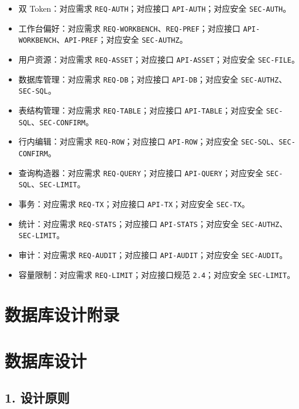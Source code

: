 \documentclass[
  a4paper,
  UTF8]{ctexart}
\providecommand{\tightlist}{%
  \setlength{\itemsep}{0pt}\setlength{\parskip}{0pt}}
\begin{document}
\begin{itemize}
\tightlist
\item
  双 Token：对应需求 \texttt{REQ-AUTH}；对应接口
  \texttt{API-AUTH}；对应安全 \texttt{SEC-AUTH}。
\item
  工作台偏好：对应需求
  \texttt{REQ-WORKBENCH}、\texttt{REQ-PREF}；对应接口
  \texttt{API-WORKBENCH}、\texttt{API-PREF}；对应安全
  \texttt{SEC-AUTHZ}。
\item
  用户资源：对应需求 \texttt{REQ-ASSET}；对应接口
  \texttt{API-ASSET}；对应安全 \texttt{SEC-FILE}。
\item
  数据库管理：对应需求 \texttt{REQ-DB}；对应接口
  \texttt{API-DB}；对应安全 \texttt{SEC-AUTHZ}、\texttt{SEC-SQL}。
\item
  表结构管理：对应需求 \texttt{REQ-TABLE}；对应接口
  \texttt{API-TABLE}；对应安全 \texttt{SEC-SQL}、\texttt{SEC-CONFIRM}。
\item
  行内编辑：对应需求 \texttt{REQ-ROW}；对应接口
  \texttt{API-ROW}；对应安全 \texttt{SEC-SQL}、\texttt{SEC-CONFIRM}。
\item
  查询构造器：对应需求 \texttt{REQ-QUERY}；对应接口
  \texttt{API-QUERY}；对应安全 \texttt{SEC-SQL}、\texttt{SEC-LIMIT}。
\item
  事务：对应需求 \texttt{REQ-TX}；对应接口 \texttt{API-TX}；对应安全
  \texttt{SEC-TX}。
\item
  统计：对应需求 \texttt{REQ-STATS}；对应接口
  \texttt{API-STATS}；对应安全 \texttt{SEC-AUTHZ}、\texttt{SEC-LIMIT}。
\item
  审计：对应需求 \texttt{REQ-AUDIT}；对应接口
  \texttt{API-AUDIT}；对应安全 \texttt{SEC-AUDIT}。
\item
  容量限制：对应需求 \texttt{REQ-LIMIT}；对应接口规范
  \texttt{2.4}；对应安全 \texttt{SEC-LIMIT}。
\end{itemize}

\hypertarget{ux6570ux636eux5e93ux8bbeux8ba1ux9644ux5f55}{%
\section{数据库设计附录}\label{ux6570ux636eux5e93ux8bbeux8ba1ux9644ux5f55}}

\hypertarget{ux6570ux636eux5e93ux8bbeux8ba1}{%
\section{数据库设计}\label{ux6570ux636eux5e93ux8bbeux8ba1}}

\hypertarget{ux8bbeux8ba1ux539fux5219}{%
\subsection{1. 设计原则}\label{ux8bbeux8ba1ux539fux5219}}
\end{document}
